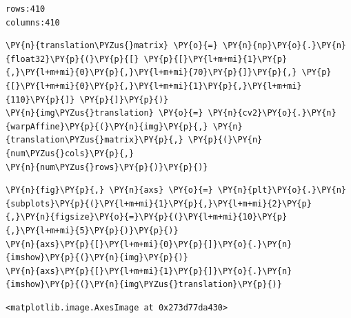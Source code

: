 \begin{Verbatim}[commandchars=\\\{\}]
rows:410
columns:410
\end{Verbatim}

\begin{tcolorbox}[breakable, size=fbox, boxrule=1pt, pad at break*=1mm,colback=cellbackground, colframe=cellborder]
	\begin{Verbatim}[commandchars=\\\{\}]
\PY{n}{translation\PYZus{}matrix} \PY{o}{=} \PY{n}{np}\PY{o}{.}\PY{n}{float32}\PY{p}{(}\PY{p}{[} \PY{p}{[}\PY{l+m+mi}{1}\PY{p}{,}\PY{l+m+mi}{0}\PY{p}{,}\PY{l+m+mi}{70}\PY{p}{]}\PY{p}{,} \PY{p}{[}\PY{l+m+mi}{0}\PY{p}{,}\PY{l+m+mi}{1}\PY{p}{,}\PY{l+m+mi}{110}\PY{p}{]} \PY{p}{]}\PY{p}{)}
\PY{n}{img\PYZus{}translation} \PY{o}{=} \PY{n}{cv2}\PY{o}{.}\PY{n}{warpAffine}\PY{p}{(}\PY{n}{img}\PY{p}{,} \PY{n}{translation\PYZus{}matrix}\PY{p}{,} \PY{p}{(}\PY{n}{num\PYZus{}cols}\PY{p}{,}
\PY{n}{num\PYZus{}rows}\PY{p}{)}\PY{p}{)}
	\end{Verbatim}
\end{tcolorbox}

\begin{tcolorbox}[breakable, size=fbox, boxrule=1pt, pad at break*=1mm,colback=cellbackground, colframe=cellborder]
	\begin{Verbatim}[commandchars=\\\{\}]
\PY{n}{fig}\PY{p}{,} \PY{n}{axs} \PY{o}{=} \PY{n}{plt}\PY{o}{.}\PY{n}{subplots}\PY{p}{(}\PY{l+m+mi}{1}\PY{p}{,}\PY{l+m+mi}{2}\PY{p}{,}\PY{n}{figsize}\PY{o}{=}\PY{p}{(}\PY{l+m+mi}{10}\PY{p}{,}\PY{l+m+mi}{5}\PY{p}{)}\PY{p}{)}
\PY{n}{axs}\PY{p}{[}\PY{l+m+mi}{0}\PY{p}{]}\PY{o}{.}\PY{n}{imshow}\PY{p}{(}\PY{n}{img}\PY{p}{)}
\PY{n}{axs}\PY{p}{[}\PY{l+m+mi}{1}\PY{p}{]}\PY{o}{.}\PY{n}{imshow}\PY{p}{(}\PY{n}{img\PYZus{}translation}\PY{p}{)}
	\end{Verbatim}
\end{tcolorbox}

\begin{tcolorbox}[breakable, size=fbox, boxrule=.5pt, pad at break*=1mm, opacityfill=0]
	\begin{Verbatim}[commandchars=\\\{\}]
<matplotlib.image.AxesImage at 0x273d77da430>
	\end{Verbatim}
\end{tcolorbox}

